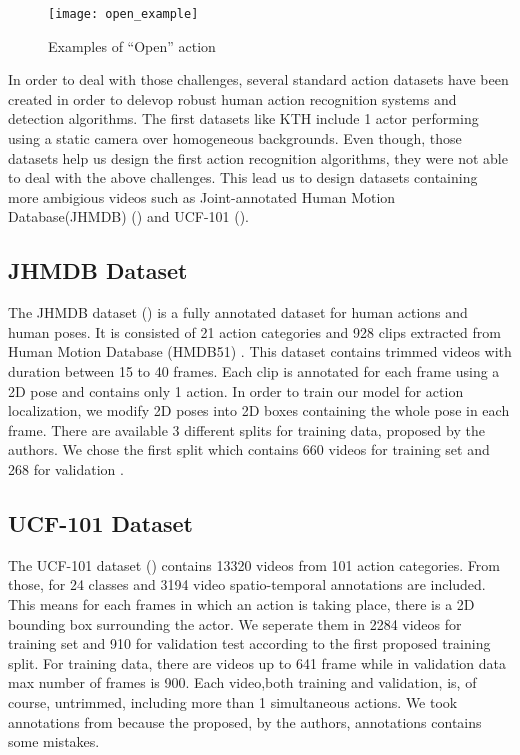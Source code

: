 \begin{figure}[h]
  \centering
  \texttt{[image: open\_example]}
  \caption{Examples of ``Open'' action}
  \label{fig:open_example}

\end{figure}

In order to deal with those challenges, several standard action datasets have been created in order to delevop
robust human action recognition systems and detection algorithms.
The first datasets like KTH\cite{} include 1 actor performing using a static camera over homogeneous backgrounds.
Even though, those datasets help us design the first action recognition algorithms, they were not able to deal with the above
challenges.
This lead us to design datasets containing more ambigious videos such as Joint-annotated Human Motion Database(JHMDB) (\cite{Kuehne11})
and UCF-101 (\cite{soomro2012ucf101}).

\subsection{JHMDB Dataset}
The JHMDB dataset (\cite{Jhuang:ICCV:2013}) is a fully annotated dataset for human actions and human poses. It is consisted of 21 action categories and 928
clips extracted from Human Motion Database (HMDB51) \cite{Kuehne11}. This dataset contains trimmed videos with duration between
15 to 40 frames. Each clip is annotated for each frame using a 2D pose and contains only 1 action.
In order to train our model for action localization, we modify 2D poses into 2D boxes containing the whole pose in each frame.
There are available 3 different splits for training data, proposed by the authors. We chose the first split which contains 660
videos for training set and 268 for validation . 

\subsection{UCF-101 Dataset}
The UCF-101 dataset (\cite{soomro2012ucf101}) contains 13320 videos from 101 action categories.
From those, for 24 classes and 3194 video spatio-temporal annotations are included. This means for each frames in which an action is taking place,
there is a 2D bounding box surrounding the actor.  We seperate them in 2284 videos for training set and 910 for validation test according to the
first proposed training split. For training data, there are videos up to 641 frame while in validation data max number of frames is 900.
Each video,both training and validation, is, of course, untrimmed,  including more than 1 simultaneous actions. We took annotations from
\cite{singh2016online} because the proposed, by the authors, annotations contains some mistakes.

